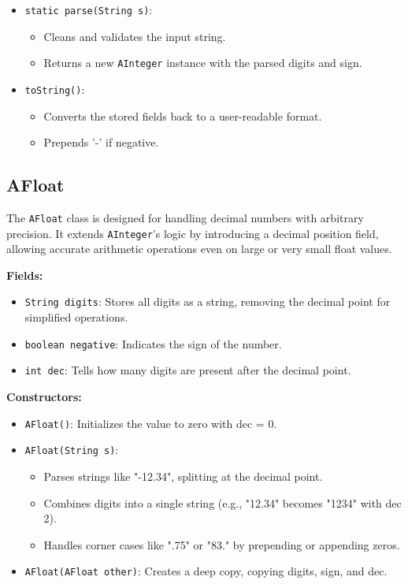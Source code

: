 \documentclass[11pt]{article}
\begin{document}
\begin{itemize}
\begin{itemize}
      \item Discards remainder to stay consistent with integer division behavior.
    \end{itemize}
  \item \texttt{static parse(String s)}:
    \begin{itemize}
      \item Cleans and validates the input string.
      \item Returns a new \texttt{AInteger} instance with the parsed digits and sign.
    \end{itemize}
  \item \texttt{toString()}:
    \begin{itemize}
      \item Converts the stored fields back to a user-readable format.
      \item Prepends '-' if negative.
    \end{itemize}
\end{itemize}

\subsection{AFloat}
The \texttt{AFloat} class is designed for handling decimal numbers with arbitrary precision. It extends \texttt{AInteger}'s logic by introducing a decimal position field, allowing accurate arithmetic operations even on large or very small float values.

\textbf{Fields:}
\begin{itemize}
  \item \texttt{String digits}: Stores all digits as a string, removing the decimal point for simplified operations.
  \item \texttt{boolean negative}: Indicates the sign of the number.
  \item \texttt{int dec}: Tells how many digits are present after the decimal point.
\end{itemize}

\textbf{Constructors:}
\begin{itemize}
  \item \texttt{AFloat()}: Initializes the value to zero with dec = 0.
  \item \texttt{AFloat(String s)}:
    \begin{itemize}
      \item Parses strings like "-12.34", splitting at the decimal point.
      \item Combines digits into a single string (e.g., "12.34" becomes "1234" with dec 2).
      \item Handles corner cases like ".75" or "83." by prepending or appending zeros.
    \end{itemize}
  \item \texttt{AFloat(AFloat other)}: Creates a deep copy, copying digits, sign, and dec.
\end{itemize}
\end{document}
